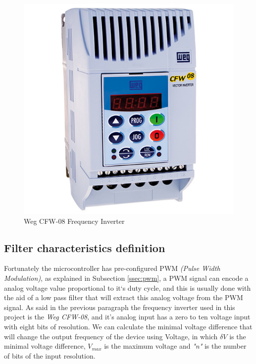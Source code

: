 		\begin{figure}[htbp]
			\centering
				\includegraphics[scale=0.4]{figuras/fig-wegCFW08}
			\caption{Weg CFW-08 Frequency Inverter \cite{fig-wegCFW08}}
			\label{fig:wegCFW08}
		\end{figure}

	\subsection{Filter characteristics definition}\label{ssec:filterCharacteristicsDefinition}
		\par
		Fortunately the microcontroller has pre-configured PWM \textit{(Pulse Width Modulation)}, as explained in Subsection \ref{ssec:pwm}, a PWM signal can encode a analog voltage value proportional to it`s duty cycle, and this is usually done with the aid of a low pass filter that will extract this analog voltage from the PWM signal. As said in the previous paragraph the frequency inverter used in this project is the \textit{Weg CFW-08}, and it's analog input has a zero to ten voltage input with eight bits of resolution. We can calculate the minimal voltage difference that will change the output frequency of the device using Voltage, in which $\delta V$ is the minimal voltage difference, $V_{max}$ is the maximum voltage and \textit{"n"} is the number of bits of the input resolution.

